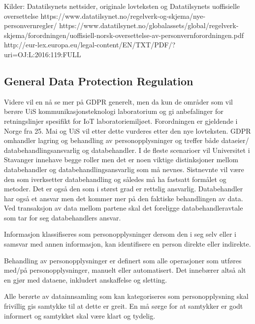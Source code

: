 \documentclass{article}
\begin{document}
Kilder:
Datatilsynets nettsider, originale lovteksten og Datatilsynets uoffisielle oversettelse
https://www.datatilsynet.no/regelverk-og-skjema/nye-personvernregler/
https://www.datatilsynet.no/globalassets/global/regelverk-skjema/forordningen/uoffisiell-norsk-oversettelse-av-personvernforordningen.pdf
http://eur-lex.europa.eu/legal-content/EN/TXT/PDF/?uri=OJ:L:2016:119:FULL

\subsection{General Data Protection Regulation}
Videre vil en nå se mer på GDPR generelt, men da kun de områder som vil berøre UiS kommunikasjonsteknologi laboratorium og gi anbefalinger for retningslinjer spesifikt for IoT laboratoriemiljøet. Forordningen er gjeldende i Norge fra 25. Mai og UiS vil etter dette vurderes etter den nye lovteksten. GDPR omhandler lagring og behandling av personopplysninger og treffer både dataeier/ databehandlingsansvarlig og databehandler. I de fleste scenarioer vil Universitet i Stavanger innehave begge roller men det er noen viktige distinksjoner mellom databehandler og databehandlingsansvarlig som må nevnes. Sistnevnte vil være den som iverksetter databehandling og således må ha fastsatt formålet og metoder. Det er også den som i størst grad er rettslig ansvarlig. Databehandler har også et ansvar men det kommer mer på den faktiske behandlingen av data. Ved transaksjon av data mellom partene skal det foreligge databehandleravtale som tar for seg databehandlers ansvar.  
 
Informasjon klassifiseres som personopplysninger dersom den i seg selv eller i samsvar med annen informasjon, kan identifisere en person direkte eller indirekte. 

Behandling av personopplysninger er definert som alle operasjoner som utføres med/på personopplysninger, manuelt eller automatisert. Det innebærer altså alt en gjør med dataene, inkludert anskaffelse og sletting. 

Alle berørte av datainnsamling som kan kategoriseres som personopplysning skal frivillig gis samtykke til at dette er greit. En må sørge for at samtykker er godt informert og samtykket skal være klart og tydelig.
\end{document}
